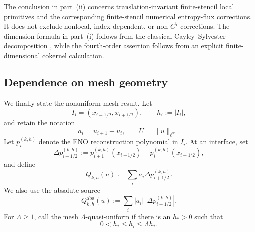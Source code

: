 \documentclass[11pt]{amsart}
\theoremstyle{plain}
\theoremstyle{definition}
\theoremstyle{remark}
\numberwithin{equation}{section}
\theoremstyle{plain}
\begin{document}
The conclusion in part~\textup{(ii)} concerns translation-invariant
finite-stencil local primitives and the corresponding finite-stencil
numerical entropy-flux corrections.  It does not exclude nonlocal,
index-dependent, or non-$C^7$ corrections. 
The dimension formula in
part~\textup{(i)} follows from the classical Cayley--Sylvester decomposition \cite{CayleySecondQuantics},
while the fourth-order assertion follows from an explicit finite-dimensional
cokernel calculation.

\subsection{Dependence on mesh geometry}
\label{sec:intro-mesh-result}

We finally state the nonuniform-mesh result.  Let
\[
	I_i=(x_{i-1/2},x_{i+1/2}),\qquad h_i:=|I_i|,
\]
and retain the notation
\[
	a_i=\bar u_{i+1}-\bar u_i,
	\qquad U=\|\bar u\|_{\ell^\infty}.
\]
Let $p_i^{(k,h)}$ denote the ENO reconstruction polynomial in $I_i$.
At an interface, set
\[
	\Delta p_{i+1/2}^{(k,h)}
	:=p_{i+1}^{(k,h)}(x_{i+1/2})
	  -p_i^{(k,h)}(x_{i+1/2}),
\]
and define
\[
	Q_{k,h}(\bar u):=\sum_i a_i\Delta p_{i+1/2}^{(k,h)}.
\]
We also use the absolute source
\begin{equation}\label{eq:intro-absolute-source}
Q_{k,h}^{\mathrm{abs}}(\bar u)
	:=\sum_i |a_i|\,|\Delta p_{i+1/2}^{(k,h)}|.
\end{equation}
For $\Lambda\ge1$, call the mesh $\Lambda$-quasi-uniform if there is an
$h_*>0$ such that
\begin{equation}\label{eq:intro-quasi-uniform}
	0<h_*\le h_i\le\Lambda h_*.
\end{equation}
\end{document}
